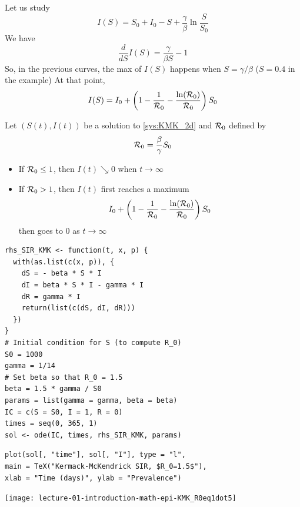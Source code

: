 \documentclass[aspectratio=43]{beamer}
\begin{document}
\begin{frame}{}
  Let us study
  $$
  I(S)=S_0+I_0-S+\frac\gamma\beta \ln \frac S{S_0} 
  $$
  We have
  $$
  \frac{d}{dS}I(S) = \frac{\gamma}{\beta S}-1
  $$
  So, in the previous curves, the max of $I(S)$ happens when $S=\gamma/\beta$ ($S=0.4$ in the example)
  \vfill
  At that point,
  $$
  I(S) = I_0+\left(
    1-\frac{1}{\mathcal{R}_0} - \frac{\ln(\mathcal{R}_0)}{\mathcal{R}_0}
  \right)S_0
  $$
\end{frame}


\begin{frame}{}
  \begin{theorem}
    Let $(S(t),I(t))$ be a solution to \eqref{sys:KMK_2d} and $\mathcal{R}_0$ defined by
    \begin{equation}\label{eq:R0_KMK}
    \mathcal{R}_0=\frac{\beta}{\gamma}S_0
    \end{equation}
    \vfill
    \begin{itemize}
      \item If $\mathcal{R}_0\leq 1$, then $I(t)\searrow 0$ when $t\to\infty$ 
      \item If $\mathcal{R}_0>1$, then $I(t)$ first reaches a maximum 
      \begin{equation}\label{eq:max_I}
        I_0+\left(
      1-\frac{1}{\mathcal{R}_0} - \frac{\ln(\mathcal{R}_0)}{\mathcal{R}_0}
      \right)S_0
      \end{equation}
      then goes to 0 as $t\to\infty$  
    \end{itemize}    
  \end{theorem}
\end{frame}


\begin{frame}[fragile]{}
\begin{lstlisting}
rhs_SIR_KMK <- function(t, x, p) {
  with(as.list(c(x, p)), {
    dS = - beta * S * I
    dI = beta * S * I - gamma * I
    dR = gamma * I
    return(list(c(dS, dI, dR)))
  })
}
# Initial condition for S (to compute R_0)
S0 = 1000
gamma = 1/14
# Set beta so that R_0 = 1.5
beta = 1.5 * gamma / S0 
params = list(gamma = gamma, beta = beta)
IC = c(S = S0, I = 1, R = 0)
times = seq(0, 365, 1)
sol <- ode(IC, times, rhs_SIR_KMK, params)  
\end{lstlisting}
\end{frame}


\begin{frame}[fragile]{}
\begin{lstlisting}
plot(sol[, "time"], sol[, "I"], type = "l",
main = TeX("Kermack-McKendrick SIR, $R_0=1.5$"),
xlab = "Time (days)", ylab = "Prevalence")
\end{lstlisting}
\begin{center}
\texttt{[image: lecture-01-introduction-math-epi-KMK\_R0eq1dot5]}
\end{center}
\end{frame}
\end{document}
